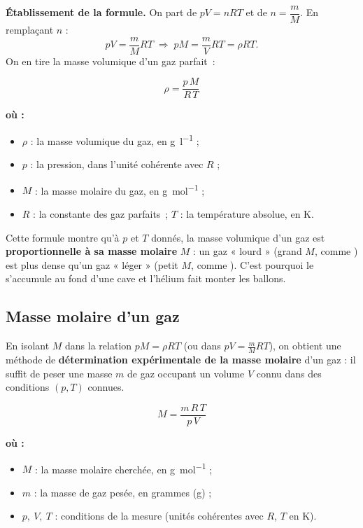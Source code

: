 \documentclass[11pt,a4paper]{article}
\newenvironment{ou}{%
  \par\smallskip\noindent\textbf{où :}\nopagebreak
  \begin{itemize}[leftmargin=1.8em,topsep=2pt,itemsep=1.5pt,parsep=0pt]}%
  {\end{itemize}}
\newcommand{\gp}{gaz parfait}
\newcommand{\GP}{gaz parfaits}
\begin{document}
\noindent \textbf{Établissement de la formule.} On part de $pV=nRT$ et de $n=\dfrac{m}{M}$. En
remplaçant $n$ :
\[ pV=\frac{m}{M}RT
   \;\Longrightarrow\;
   pM=\frac{m}{V}RT=\rho RT. \]
On en tire la masse volumique d'un \gp\ :

\begin{formule}
\[ \boxed{\,\rho = \dfrac{p\,M}{R\,T}\,} \]
\end{formule}

\begin{ou}
  \item $\rho$ : la masse volumique du gaz, en \si{\gram\per\litre} ;
  \item $p$ : la pression, dans l'unité cohérente avec $R$ ;
  \item $M$ : la masse molaire du gaz, en \si{\gram\per\mole} ;
  \item $R$ : la constante des \GP\ ; \quad $T$ : la température absolue, en \si{\kelvin}.
\end{ou}

\begin{remarque}
Cette formule montre qu'à $p$ et $T$ donnés, la masse volumique d'un gaz est \textbf{proportionnelle à
sa masse molaire} $M$ : un gaz « lourd » (grand $M$, comme ) est plus dense qu'un gaz « léger »
(petit $M$, comme ). C'est pourquoi le  s'accumule au fond d'une cave et l'hélium fait
monter les ballons.
\end{remarque}

\subsection{Masse molaire d'un gaz}

En isolant $M$ dans la relation $pM=\rho RT$ (ou dans $pV=\frac{m}{M}RT$), on obtient une méthode de
\textbf{détermination expérimentale de la masse molaire} d'un gaz : il suffit de peser une masse $m$ de
gaz occupant un volume $V$ connu dans des conditions $(p,T)$ connues.

\begin{formule}
\[ \boxed{\,M = \dfrac{m\,R\,T}{p\,V}\,} \]
\end{formule}

\begin{ou}
  \item $M$ : la masse molaire cherchée, en \si{\gram\per\mole} ;
  \item $m$ : la masse de gaz pesée, en grammes (\si{\gram}) ;
  \item $p,\ V,\ T$ : conditions de la mesure (unités cohérentes avec $R$, $T$ en \si{\kelvin}).
\end{ou}
\end{document}
